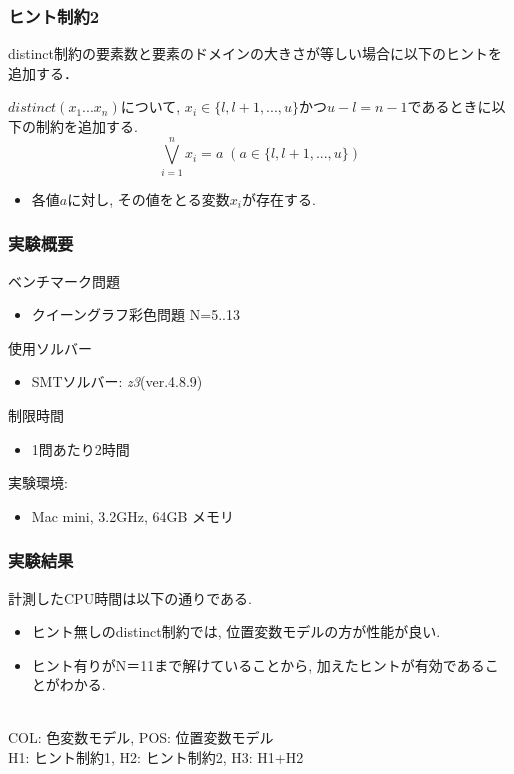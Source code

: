\documentclass [dvipdfmx,12pt]{beamer}
\begin{document}
\begin{frame}
\frametitle{ヒント制約2}
distinct制約の要素数と要素のドメインの大きさが等しい場合に以下のヒントを追加する．
\begin{exampleblock}{}
$distinct(x_1 ... x_n)$について, $x_i \in \{l, l+1, ..., u\}$かつ$u-l=n-1$であるときに以下の制約を追加する.\\
$$\bigvee_{i=1}^n x_i=a \; (a \in \{l, l+1, ..., u\})$$
\end{exampleblock}
\begin{itemize}
\item 各値$a$に対し, その値をとる変数$x_i$が存在する.
\end{itemize}
\end{frame}



\begin{frame}
\frametitle{実験概要}
ベンチマーク問題
\begin{itemize}
\item クイーングラフ彩色問題 N=5..13
\end{itemize}
使用ソルバー
\begin{itemize}
\item SMTソルバー: \textit{z3}(ver.4.8.9)
\end{itemize}
制限時間
\begin{itemize}
\item 1問あたり2時間
\end{itemize}
実験環境:
\begin{itemize}
\item Mac mini,  3.2GHz,  64GB メモリ
\end{itemize}
\end{frame}



\begin{frame}
\frametitle{実験結果}
計測したCPU時間は以下の通りである.
\begin{block}{}
    {\tiny  }
\end{block}
\begin{itemize}
\item ヒント無しのdistinct制約では, 位置変数モデルの方が性能が良い.
\item ヒント有りがN＝11まで解けていることから, 加えたヒントが有効であることがわかる.
\end{itemize}
\\
{\footnotesize COL: 色変数モデル, POS: 位置変数モデル}\\
{\footnotesize H1: ヒント制約1, H2: ヒント制約2, H3: H1+H2}
\end{frame}
\end{document}
